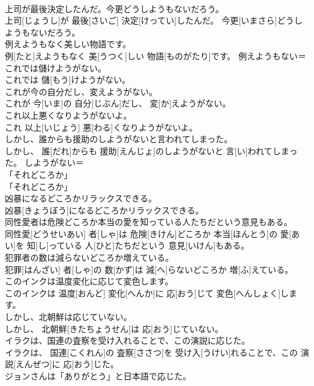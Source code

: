 \documentclass[8pt]{extreport}
\begin{document}
\begin{CJK}{UTF8}{min}
\\	上司が最後決定したんだ。今更どうしようもないだろう。	
\\	上司[じょうし]が 最後[さいご] 決定[けってい]したんだ。 今更[いまさら]どうしようもないだろう。	
\\	例えようもなく美しい物語です。	
\\	例[たと]えようもなく 美[うつく]しい 物語[ものがたり]です。	例えようもない＝ 
\\	これでは儲けようがない。	
\\	これでは 儲[もう]けようがない。	
\\	これが今の自分だし、変えようがない。	
\\	これが 今[いま]の 自分[じぶん]だし、 変[か]えようがない。	
\\	これ以上悪くなりようがないよ。	
\\	これ 以上[いじょう] 悪[わる]くなりようがないよ。	
\\	しかし、誰からも援助のしようがないと言われてしまった。	
\\	しかし、 誰[だれ]からも 援助[えんじょ]のしようがないと 言[い]われてしまった。	しようがない＝ 
\\	「それどころか」	
\\	「それどころか」	
\\	凶暴になるどころかリラックスできる。	
\\	凶暴[きょうぼう]になるどころかリラックスできる。	
\\	同性愛者は危険どころか本当の愛を知っている人たちだという意見もある。	
\\	同性愛[どうせいあい] 者[しゃ]は 危険[きけん]どころか 本当[ほんとう]の 愛[あい]を 知[し]っている 人[ひと]たちだという 意見[いけん]もある。	
\\	犯罪者の数は減らないどころか増えている。	
\\	犯罪[はんざい] 者[しゃ]の 数[かず]は 減[へ]らないどころか 増[ふ]えている。	
\\	このインクは温度変化に応じて変色します。	
\\	このインクは 温度[おんど] 変化[へんか]に 応[おう]じて 変色[へんしょく]します。	
\\	しかし、北朝鮮は応じていない。	
\\	しかし、 北朝鮮[きたちょうせん]は 応[おう]じていない。	
\\	イラクは、国連の査察を受け入れることで、この演説に応じた。	
\\	イラクは、 国連[こくれん]の 査察[ささつ]を 受け入[うけい]れることで、この 演説[えんぜつ]に 応[おう]じた。	
\\	ジョンさんは「ありがとう」と日本語で応じた。	

\end{CJK}
\end{document}
